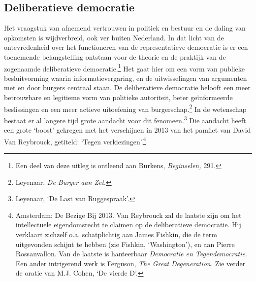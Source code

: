 \documentclass[smallauthor, chapterhaspagenum, nochapterinheader, pagenuminheader,  bigchapnum,medium2, tocpages, garamond, titleinheader]{jote-book}
\begin{document}
	\subsection{Deliberatieve democratie}



	Het vraagstuk van afnemend vertrouwen in politiek en bestuur en de daling van opkomsten is wijdverbreid, ook ver buiten Nederland. In dat licht van de ontevredenheid over het functioneren van de representatieve democratie is er een toenemende belangstelling ontstaan voor de theorie en de praktijk van de zogenaamde deliberatieve democratie.\footnote{Een deel van deze uitleg is ontleend aan Burkens, \emph{Beginselen,} 291.} Het gaat hier om een vorm van publieke besluitvorming waarin informatievergaring, en de uitwisselingen van argumenten met en door burgers centraal staan. De deliberatieve democratie belooft een meer betrouwbare en legitieme vorm van politieke autoriteit, beter geïnformeerde beslissingen en een meer actieve uitoefening van burgerschap.\footnote{Leyenaar, \emph{De Burger aan Zet}.} In de wetenschap bestaat er al langere tijd grote aandacht voor dit fenomeen.\footnote{Leyenaar, ‘De Last van Ruggespraak'.} Die aandacht heeft een grote ‘boost' gekregen met het verschijnen in 2013 van het pamflet van David Van Reybrouck, getiteld: ‘Tegen verkiezingen'.\footnote{Amsterdam: De Bezige Bij 2013. Van Reybrouck zal de laatste zijn om het intellectuele eigendomsrecht te claimen op de deliberatieve democratie. Hij verklaart zichzelf o.a. schatplichtig aan James Fishkin, die de term uitgevonden schijnt te hebben (zie Fishkin, ‘Washington'), en aan Pierre Rossanvallon. Van de laatste is hanteerbaar \emph{Democratie en Tegendemocratie}. Een ander intrigerend werk is Ferguson, \emph{The Great }\emph{Degeneration}\emph{.} Zie verder de oratie van M.J. Cohen, ‘De vierde D'.}
\end{document}
